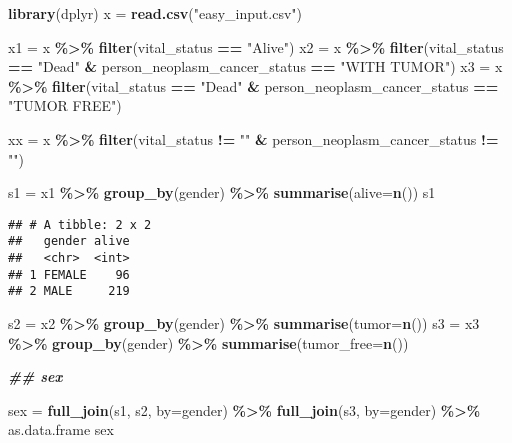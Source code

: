 \documentclass[
]{article}
\newenvironment{Shaded}{\begin{snugshade}}{\end{snugshade}}
\newcommand{\AttributeTok}[1]{\textcolor[rgb]{0.13,0.29,0.53}{#1}}
\newcommand{\DocumentationTok}[1]{\textcolor[rgb]{0.56,0.35,0.01}{\textbf{\textit{#1}}}}
\newcommand{\FunctionTok}[1]{\textcolor[rgb]{0.13,0.29,0.53}{\textbf{#1}}}
\newcommand{\NormalTok}[1]{#1}
\newcommand{\OtherTok}[1]{\textcolor[rgb]{0.56,0.35,0.01}{#1}}
\newcommand{\SpecialCharTok}[1]{\textcolor[rgb]{0.81,0.36,0.00}{\textbf{#1}}}
\newcommand{\StringTok}[1]{\textcolor[rgb]{0.31,0.60,0.02}{#1}}
\begin{document}
\begin{Shaded}
\begin{Highlighting}[]
\FunctionTok{library}\NormalTok{(dplyr)}
\NormalTok{x }\OtherTok{=} \FunctionTok{read.csv}\NormalTok{(}\StringTok{"easy\_input.csv"}\NormalTok{)}

\NormalTok{x1 }\OtherTok{=}\NormalTok{ x }\SpecialCharTok{\%\textgreater{}\%} \FunctionTok{filter}\NormalTok{(vital\_status }\SpecialCharTok{==} \StringTok{"Alive"}\NormalTok{) }
\NormalTok{x2 }\OtherTok{=}\NormalTok{ x }\SpecialCharTok{\%\textgreater{}\%} \FunctionTok{filter}\NormalTok{(vital\_status }\SpecialCharTok{==} \StringTok{"Dead"} \SpecialCharTok{\&}\NormalTok{ person\_neoplasm\_cancer\_status }\SpecialCharTok{==} \StringTok{"WITH TUMOR"}\NormalTok{) }
\NormalTok{x3 }\OtherTok{=}\NormalTok{ x }\SpecialCharTok{\%\textgreater{}\%} \FunctionTok{filter}\NormalTok{(vital\_status }\SpecialCharTok{==} \StringTok{"Dead"} \SpecialCharTok{\&}\NormalTok{ person\_neoplasm\_cancer\_status }\SpecialCharTok{==} \StringTok{"TUMOR FREE"}\NormalTok{)}

\NormalTok{xx }\OtherTok{=}\NormalTok{ x }\SpecialCharTok{\%\textgreater{}\%} \FunctionTok{filter}\NormalTok{(vital\_status }\SpecialCharTok{!=} \StringTok{""} \SpecialCharTok{\&}\NormalTok{ person\_neoplasm\_cancer\_status }\SpecialCharTok{!=} \StringTok{""}\NormalTok{)}

\NormalTok{s1 }\OtherTok{=}\NormalTok{ x1 }\SpecialCharTok{\%\textgreater{}\%} \FunctionTok{group\_by}\NormalTok{(gender) }\SpecialCharTok{\%\textgreater{}\%} \FunctionTok{summarise}\NormalTok{(}\AttributeTok{alive=}\FunctionTok{n}\NormalTok{())}
\NormalTok{s1}
\end{Highlighting}
\end{Shaded}

\begin{verbatim}
## # A tibble: 2 x 2
##   gender alive
##   <chr>  <int>
## 1 FEMALE    96
## 2 MALE     219
\end{verbatim}

\begin{Shaded}
\begin{Highlighting}[]
\NormalTok{s2 }\OtherTok{=}\NormalTok{ x2 }\SpecialCharTok{\%\textgreater{}\%} \FunctionTok{group\_by}\NormalTok{(gender) }\SpecialCharTok{\%\textgreater{}\%} \FunctionTok{summarise}\NormalTok{(}\AttributeTok{tumor=}\FunctionTok{n}\NormalTok{())}
\NormalTok{s3 }\OtherTok{=}\NormalTok{ x3 }\SpecialCharTok{\%\textgreater{}\%} \FunctionTok{group\_by}\NormalTok{(gender) }\SpecialCharTok{\%\textgreater{}\%} \FunctionTok{summarise}\NormalTok{(}\AttributeTok{tumor\_free=}\FunctionTok{n}\NormalTok{())}

\DocumentationTok{\#\# sex}

\NormalTok{sex }\OtherTok{=} \FunctionTok{full\_join}\NormalTok{(s1, s2, }\AttributeTok{by=}\StringTok{\textquotesingle{}gender\textquotesingle{}}\NormalTok{) }\SpecialCharTok{\%\textgreater{}\%} \FunctionTok{full\_join}\NormalTok{(s3, }\AttributeTok{by=}\StringTok{\textquotesingle{}gender\textquotesingle{}}\NormalTok{) }\SpecialCharTok{\%\textgreater{}\%}\NormalTok{ as.data.frame}
\NormalTok{sex}
\end{Highlighting}
\end{Shaded}
\end{document}
